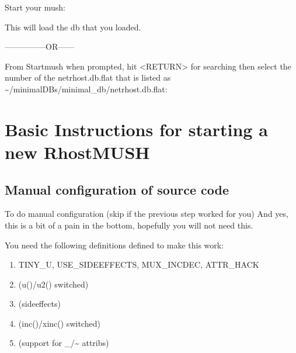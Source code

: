 \documentclass[letterpaper,10pt,english]{sphinxmanual}
\begin{document}
\begin{enumerate}
\sphinxAtStartPar
Start your mush:

\begin{sphinxVerbatim}[commandchars=\\\{\}]
\end{sphinxVerbatim}

\sphinxAtStartPar
This will load the db that you loaded.

\sphinxAtStartPar
—————OR——\sphinxhyphen{}

\sphinxAtStartPar
From Startmush when prompted, hit \textless{}RETURN\textgreater{} for searching then select the number of the netrhost.db.flat that is listed as \textasciitilde{}/minimal\sphinxhyphen{}DBs/minimal\_db/netrhost.db.flat:

\begin{sphinxVerbatim}[commandchars=\\\{\}]
\end{sphinxVerbatim}

\end{enumerate}


\section{Basic Instructions for starting a new RhostMUSH}
\label{\detokenize{install:basic-instructions-for-starting-a-new-rhostmush}}

\subsection{Manual configuration of source code}
\label{\detokenize{install:manual-configuration-of-source-code}}
\sphinxAtStartPar
To do manual configuration (skip if the previous step worked for you) And yes, this is a bit of a pain in the bottom, hopefully you will not need this.

\sphinxAtStartPar
You need the following definitions defined to make this work:
\begin{enumerate}
%
\item {} 
\sphinxAtStartPar
TINY\_U, USE\_SIDEEFFECTS, MUX\_INCDEC, ATTR\_HACK

\item {} 
\sphinxAtStartPar
(u()/u2() switched)

\item {} 
\sphinxAtStartPar
(sideeffects)

\item {} 
\sphinxAtStartPar
(inc()/xinc() switched)

\item {} 
\sphinxAtStartPar
(support for \_/\textasciitilde{} attribs)

\end{enumerate}
\end{document}

